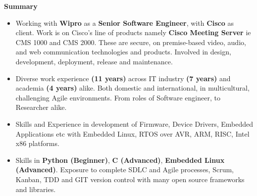 \begin{center}
    \textbf{Summary}
\end{center}

\begin{itemize}
            \item {Working with \textbf{Wipro} as a \textbf{Senior Software Engineer}, with \textbf{Cisco} as client. Work is on Cisco's line of products namely \textbf{Cisco Meeting Server} ie CMS 1000 and CMS 2000. These are secure, on premise-based video, audio, and web communication technologies and products. Involved in design, development, deployment, release and maintenance.}\\
           
            
            \item {Diverse work experience \textbf{(11 years)} across IT industry \textbf{(7 years)} and academia \textbf{(4 years)} alike. Both domestic and international, in multicultural, challenging Agile environments. From roles of Software engineer, to Researcher alike.}\\
            
            \item {Skills and Experience in development of Firmware, Device Drivers, Embedded Applications etc with Embedded Linux, RTOS over AVR, ARM, RISC, Intel x86 platforms.}\\
            
            \item {Skills in  \textbf{Python (Beginner)}, \textbf{C (Advanced)}, \textbf{Embedded Linux (Advanced)}. Exposure to complete SDLC and Agile processes, Scrum, Kanban, TDD and GIT version control with many open source frameworks and libraries.}\\
            
            

\end{itemize}
